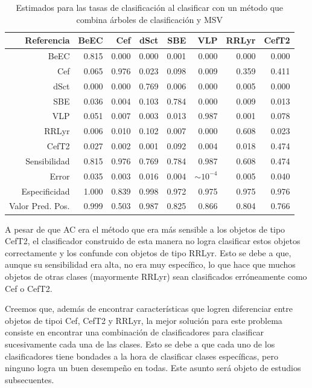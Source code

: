 \documentclass[letterpaper,12pt]{book}
\begin{document}
\begin{table}[ht]
  \centering
  \begin{tabular}{rrrrrrrr}
    \hline
    \hline
    Referencia & BeEC & Cef & dSct & SBE & VLP & RRLyr & CefT2 \\ 
    \hline
    \hline
    BeEC & 0.815 & 0.000 & 0.000 & 0.001 & 0.000 & 0.000 & 0.000 \\ 
    Cef & 0.065 & 0.976 & 0.023 & 0.098 & 0.009 & 0.359 & 0.411 \\ 
    dSct & 0.000 & 0.000 & 0.769 & 0.006 & 0.000 & 0.005 & 0.000 \\ 
    SBE & 0.036 & 0.004 & 0.103 & 0.784 & 0.000 & 0.009 & 0.013 \\ 
    VLP & 0.051 & 0.007 & 0.003 & 0.013 & 0.987 & 0.001 & 0.078 \\ 
    RRLyr & 0.006 & 0.010 & 0.102 & 0.007 & 0.000 & 0.608 & 0.023 \\ 
    CefT2 & 0.027 & 0.002 & 0.001 & 0.092 & 0.004 & 0.018 & 0.474 \\  
    \hline
    \hline
    Sensibilidad & 0.815 & 0.976 & 0.769 & 0.784 & 0.987 & 0.608 & 0.474 \\ 
    \hline
    Error & 0.035 & 0.003 & 0.016 & 0.004 & $\sim 10^{-4}$ & 0.005 & 0.040 \\ 
    \hline
    \hline
    Especificidad &  1.000 & 0.839 & 0.998 & 0.972 & 0.975 & 0.975 & 0.976 \\ 
    \hline
    \hline
    Valor Pred. Pos. &  0.999 & 0.503 & 0.987 & 0.825 & 0.866 & 0.804 & 0.766 \\ 
    \hline
    \hline
  \end{tabular}
  \caption{Estimados para las tasas de clasificación al clasificar con un método que combina árboles de clasificación y MSV }
  \label{cuadro:clasificadorriollo}
\end{table} 

A pesar de que AC era el método que era más sensible a los objetos de tipo CefT2, el clasificador construido de esta manera no logra clasificar estos objetos correctamente y los confunde con objetos de tipo RRLyr. Esto se debe a que, aunque su sensibilidad era alta, no era muy específico, lo que hace que muchos objetos de otras clases (mayormente RRLyr) sean clasificados erróneamente como Cef o CefT2. 

Creemos que, además de encontrar características que logren diferenciar entre objetos de tipoi Cef, CefT2 y RRLyr, la mejor solución para este problema consiste en encontrar una combinación de clasificadores para clasificar sucesivamente cada una de las clases. Esto se debe a que cada uno de los clasificadores tiene bondades a la hora de clasificar clases específicas, pero ninguno logra un buen desempeño en todas. Este asunto será objeto de estudios subsecuentes.
\end{document}
